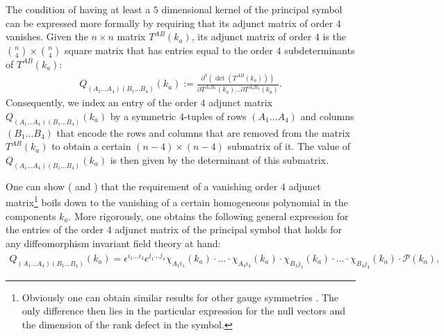 The condition of having at least a $5$ dimensional kernel of the principal symbol can be expressed more formally by requiring that its adjunct matrix of order $4$ vanishes. Given the $n \times n$ matrix $T^{AB}(k_a)$, its adjunct matrix of order $4$ is the $\binom{n}{4} \times \binom{n}{4}$ square matrix that has entries equal to the order $4$ subdeterminants of $T^{AB}(k_a)$:
\begin{align}\label{MinorDef}
    Q_{(A_1...A_4) (B_1...B_4)}(k_a) := \frac{\partial^4 (\operatorname{det}(T^{AB}(k_a)))}{\partial T^{A_1 B_1}(k_a) ... \partial T^{A_4 B_4}(k_a)}.
\end{align}
Consequently, we index an entry of the order $4$ adjunct matrix $Q_{(A_1...A_4) (B_1...B_4)}(k_a)$ by a symmetric $4$-tuples of rows $(A_1...A_4)$ and columns $(B_1...B_4)$ that encode the rows and columns that are removed from the matrix $T^{AB}(k_a)$ to obtain a certain $(n-4) \times (n-4)$ submatrix of it. The value of $Q_{(A_1...A_4) (B_1...B_4)}(k_a)$ is then given by the determinant of this submatrix. 

One can show (\cite{2018PhRvD..97h4036D} and \cite{2009JPhA...42U5402I}) that the requirement of a vanishing order $4$ adjunct matrix\footnote{Obviously one can obtain similar results for other gauge symmetries \cite{2018PhRvD..97h4036D}. The only difference then lies in the particular expression for the null vectors and the dimension of the rank defect in the symbol.} boils down to the vanishing of a certain homogeneous polynomial in the components $k_a$. More rigorously, one obtains the following general expression for the entries of the order $4$ adjunct matrix of the principal symbol that holds for any diffeomorphism invariant field theory at hand:
\begin{align}\label{diffeoMinor}
    Q_{(A_1...A_4) (B_1...B_4)}(k_a) = \epsilon^{i_1...i_4} \epsilon^{j_1...j_4} \chi_{A_1i_1}(k_a) \cdot ... \cdot \chi_{A_4i_4}(k_a) \cdot \chi_{B_1j_1}(k_a) \cdot ... \cdot \chi_{B_4j_4}(k_a) \cdot \mathcal{P}(k_a),
\end{align}

